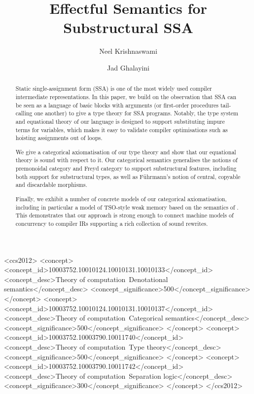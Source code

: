 \documentclass[acmsmall,screen,review]{acmart}
\begin{document}
\title{Effectful Semantics for Substructural SSA}

\author{Neel Krishnaswami}

\author{Jad Ghalayini}

\begin{abstract}
  Static single-assignment form (SSA) is one of the most widely used
  compiler intermediate representations. In this paper, we build on
  the observation that SSA can be seen as a language of basic blocks
  with arguments (or first-order procedures tail-calling one another)
  to give a type theory for SSA programs. Notably, the type system and
  equational theory of our language is designed to support
  substituting impure terms for variables, which makes it easy to
  validate compiler optimisations such as hoisting assignments out of
  loops.

  We give a categorical axiomatisation of our type theory and show
  that our equational theory is sound with respect to it. Our
  categorical semantics generalises the notions of premonoidal
  category and Freyd category to support substructural features,
  including both support for substructural types, as well as
  F\"{u}hrmann's notion of central, copyable and discardable
  morphisms.

  Finally, we exhibit a number of concrete models of our categorical
  axiomatisation, including in particular a model of TSO-style weak
  memory based on the semantics of \citet{sparky}. This demonstrates
  that our approach is strong enough to connect machine models of
  concurrency to compiler IRs supporting a rich collection of sound
  rewrites.
\end{abstract}

\begin{CCSXML}
  <ccs2012>
  <concept>
  <concept_id>10003752.10010124.10010131.10010133</concept_id>
  <concept_desc>Theory of computation~Denotational semantics</concept_desc>
  <concept_significance>500</concept_significance>
  </concept>
  <concept>
  <concept_id>10003752.10010124.10010131.10010137</concept_id>
  <concept_desc>Theory of computation~Categorical semantics</concept_desc>
  <concept_significance>500</concept_significance>
  </concept>
  <concept>
  <concept_id>10003752.10003790.10011740</concept_id>
  <concept_desc>Theory of computation~Type theory</concept_desc>
  <concept_significance>500</concept_significance>
  </concept>
  <concept>
  <concept_id>10003752.10003790.10011742</concept_id>
  <concept_desc>Theory of computation~Separation logic</concept_desc>
  <concept_significance>300</concept_significance>
  </concept>
  </ccs2012>
\end{CCSXML}
\end{document}

